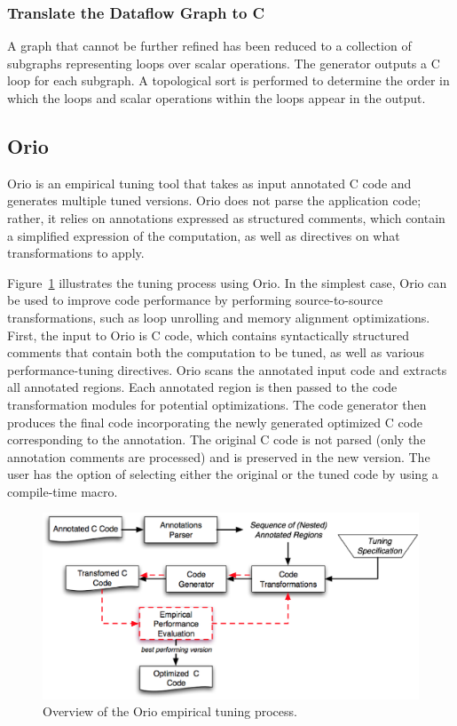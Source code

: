 \documentclass[runningheads]{llncs}
\begin{document}
\subsubsection{Translate the Dataflow Graph to C}

A graph that cannot be further refined has been reduced to a collection of subgraphs representing loops over scalar operations. The generator outputs a C loop for each subgraph.  A topological sort is performed to determine the order in which the loops and scalar operations within the loops appear in the output.
\subsection{Orio}
\label{sec:orio}

Orio is an empirical tuning tool that takes as input annotated C code and generates multiple tuned versions. Orio does not parse the application code; rather, it relies on annotations expressed as structured comments, which contain a simplified expression of the computation, as well as directives on what transformations to apply.

Figure~\ref{fig:orio} illustrates the tuning process using Orio. In the simplest case, Orio can be used to improve code performance by performing source-to-source transformations, such as loop unrolling and memory alignment optimizations. First, the input to Orio is C code, which contains syntactically structured comments that contain both the computation to be tuned, as well as various performance-tuning directives. Orio scans the annotated input code and extracts all annotated regions. Each annotated region is then passed to the code transformation modules for potential optimizations. The code generator then produces the final code incorporating the newly generated optimized C code corresponding to the annotation. The original C code is not parsed (only the annotation comments are processed) and is preserved in the new version. The user has the option of selecting either the original or the tuned code by using a compile-time macro.



\begin{figure}[htbp]
\centering
\includegraphics[width=.7\textwidth]{figures/orio.eps}
\caption{Overview of the Orio empirical tuning process.}
\label{fig:orio}
\end{figure}
\end{document}

